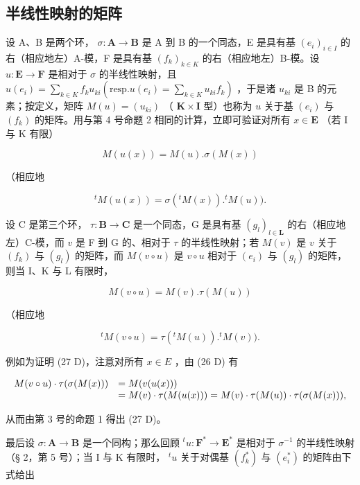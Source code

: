 \subsection{半线性映射的矩阵}

设 A、B 是两个环， \(\sigma: \mathbf{A} \to \mathbf{B}\) 是 A 到 B 的一个同态，E 是具有基 \((e_i)_{i \in I}\) 的右（相应地左）A-模，F 是具有基 \((f_k)_{k\in K}\) 的右（相应地左）B-模。设 \(u:\mathbf{E}\to \mathbf{F}\) 是相对于 \(\sigma\) 的半线性映射，且 \(u(e_i) = \sum_{k\in K}f_ku_{ki}\left(\text{resp.} u(e_i) = \sum_{k\in K}u_{ki}f_k\right)\) ，于是诸 \(u_{ki}\) 是 B 的元素；按定义，矩阵 \(M(u) = (u_{ki})\) （ \(\mathbf{K}\times \mathbf{I}\) 型）也称为 \(u\) 关于基 \((e_i)\) 与 \((f_k)\) 的矩阵。用与第 4 号命题 2 相同的计算，立即可验证对所有 \(x\in \mathbf{E}\) （若 I 与 K 有限）

\[
M (u (x)) = M (u). \sigma (M (x))\tag{26 D}
\]

（相应地

\[
{ } ^ { t } M ( u ( x ) ) = \sigma ( { } ^ { t } M ( x ) ) . { } ^ { t } M ( u ) ) .\tag{26 G}
\]

设 C 是第三个环， \(\tau: \mathbf{B} \to \mathbf{C}\) 是一个同态，G 是具有基 \((g_l)_{l \in \mathbf{L}}\) 的右（相应地左）C-模，而 \(v\) 是 F 到 G 的、相对于 \(\tau\) 的半线性映射；若 \(M(v)\) 是 \(v\) 关于 \((f_k)\) 与 \((g_l)\) 的矩阵，而 \(M(v \circ u)\) 是 \(v \circ u\) 相对于 \((e_i)\) 与 \((g_l)\) 的矩阵，则当 I、K 与 L 有限时，

\[
M (v \circ u) = M (v). \tau (M (u))\tag{27 D}
\]

（相应地

\[
{ } ^ { t } M ( v \circ u ) = \tau ( { } ^ { t } M ( u ) ) . { } ^ { t } M ( v ) ) .\tag{27 G}
\]

例如为证明 (27 D)，注意对所有 \(x \in E\) ，由 (26 D) 有

\[
\begin{array}{r l} M (v \circ u) \cdot \tau (\sigma (M (x))) & = M (v (u (x))) \\ & = M (v) \cdot \tau (M (u (x))) = M (v) \cdot \tau (M (u)) \cdot \tau (\sigma (M (x))), \end{array}
\]

从而由第 3 号的命题 1 得出 (27 D)。

最后设 \(\sigma: \mathbf{A} \to \mathbf{B}\) 是一个同构；那么回顾 \(^t u: \mathbf{F}^* \to \mathbf{E}^*\) 是相对于 \(\sigma^{-1}\) 的半线性映射（§ 2，第 5 号）；当 I 与 K 有限时， \(^t u\) 关于对偶基 \((f_k^*)\) 与 \((e_i^*)\) 的矩阵由下式给出

